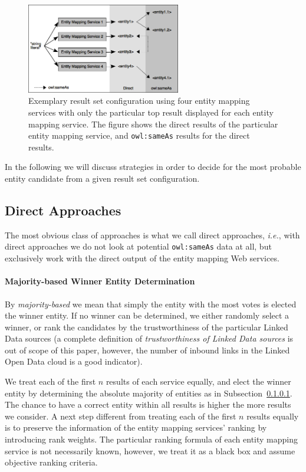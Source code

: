 \documentclass[twocolumn]{article}
\begin{document}
\begin{figure}
 \centering
 \vspace{2em}
 \includegraphics[width=0.6\textwidth]{diagram.png}
 \caption{Exemplary result set configuration using four entity mapping services with only the particular top result displayed for each entity mapping service. The figure shows the direct results of the particular entity mapping service, and \texttt{owl:sameAs} results for the direct results.}
 \label{fig:diagram}
\end{figure}

In the following we will discuss strategies in order to decide for the most probable entity candidate from a given
result set configuration.

\subsection{Direct Approaches}
The most obvious class of approaches is what we call direct approaches, \emph{i.e.}, with direct approaches we do not look at potential \texttt{owl:sameAs} data at all, but exclusively work with the direct output of the entity mapping Web services.

\paragraph{Majority-based Winner Entity Determination}\label{sec:direct}
By \textit{majority-based} we mean that simply the entity with the most votes is elected the winner entity. If no
winner can be determined, we either randomly select a winner, or rank the candidates by the trustworthiness of the
particular Linked Data sources (a complete definition of \textit{trustworthiness of Linked Data sources} is out of
scope of this paper, however, the number of inbound links in the Linked Open Data
cloud is a good indicator).

We treat each of the first $n$ results of each service equally, and elect the winner entity by determining the
absolute majority of entities as in Subsection~\ref{sec:direct}. The chance to have a correct entity within all results is
higher the more results we consider. A next step different from treating each of the first $n$
results equally is to preserve the information of the entity mapping services' ranking by introducing rank
weights. The particular ranking formula of each entity mapping service is not necessarily known, however, we treat it as a black box and assume objective ranking criteria.
\end{document}

